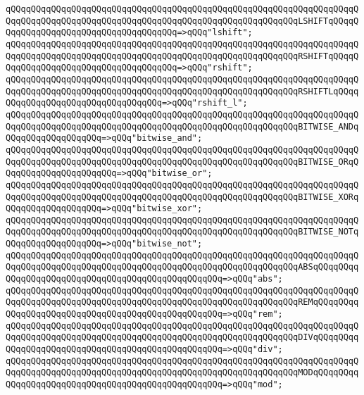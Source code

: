 \verb|qQQqqQQqqQQqqQQqqQQqqQQqqQQqqQQqqQQqqQQqqQQqqQQqqQQqqQQqqQQqqQQqqQQqqQQqqQQqqQQqqQQqqQQqqQQqqQQqqQQqqQQqqQQqqQQqqQQqqQQqqQQqqQQqLSHIFTqQQqqQQqqQQqqQQqqQQqqQQqqQQqqQQqqQQqqQQq=>qQQq"lshift";|\newline
\verb|qQQqqQQqqQQqqQQqqQQqqQQqqQQqqQQqqQQqqQQqqQQqqQQqqQQqqQQqqQQqqQQqqQQqqQQqqQQqqQQqqQQqqQQqqQQqqQQqqQQqqQQqqQQqqQQqqQQqqQQqqQQqqQQqRSHIFTqQQqqQQqqQQqqQQqqQQqqQQqqQQqqQQqqQQqqQQq=>qQQq"rshift";|\newline
\verb|qQQqqQQqqQQqqQQqqQQqqQQqqQQqqQQqqQQqqQQqqQQqqQQqqQQqqQQqqQQqqQQqqQQqqQQqqQQqqQQqqQQqqQQqqQQqqQQqqQQqqQQqqQQqqQQqqQQqqQQqqQQqqQQqRSHIFTLqQQqqQQqqQQqqQQqqQQqqQQqqQQqqQQqqQQq=>qQQq"rshift_l";|\newline
\verb|qQQqqQQqqQQqqQQqqQQqqQQqqQQqqQQqqQQqqQQqqQQqqQQqqQQqqQQqqQQqqQQqqQQqqQQqqQQqqQQqqQQqqQQqqQQqqQQqqQQqqQQqqQQqqQQqqQQqqQQqqQQqqQQqBITWISE_ANDqQQqqQQqqQQqqQQqqQQq=>qQQq"bitwise_and";|\newline
\verb|qQQqqQQqqQQqqQQqqQQqqQQqqQQqqQQqqQQqqQQqqQQqqQQqqQQqqQQqqQQqqQQqqQQqqQQqqQQqqQQqqQQqqQQqqQQqqQQqqQQqqQQqqQQqqQQqqQQqqQQqqQQqqQQqBITWISE_ORqQQqqQQqqQQqqQQqqQQqqQQq=>qQQq"bitwise_or";|\newline
\verb|qQQqqQQqqQQqqQQqqQQqqQQqqQQqqQQqqQQqqQQqqQQqqQQqqQQqqQQqqQQqqQQqqQQqqQQqqQQqqQQqqQQqqQQqqQQqqQQqqQQqqQQqqQQqqQQqqQQqqQQqqQQqqQQqBITWISE_XORqQQqqQQqqQQqqQQqqQQq=>qQQq"bitwise_xor";|\newline
\verb|qQQqqQQqqQQqqQQqqQQqqQQqqQQqqQQqqQQqqQQqqQQqqQQqqQQqqQQqqQQqqQQqqQQqqQQqqQQqqQQqqQQqqQQqqQQqqQQqqQQqqQQqqQQqqQQqqQQqqQQqqQQqqQQqBITWISE_NOTqQQqqQQqqQQqqQQqqQQq=>qQQq"bitwise_not";|\newline
\verb|qQQqqQQqqQQqqQQqqQQqqQQqqQQqqQQqqQQqqQQqqQQqqQQqqQQqqQQqqQQqqQQqqQQqqQQqqQQqqQQqqQQqqQQqqQQqqQQqqQQqqQQqqQQqqQQqqQQqqQQqqQQqqQQqABSqQQqqQQqqQQqqQQqqQQqqQQqqQQqqQQqqQQqqQQqqQQqqQQqqQQq=>qQQq"abs";|\newline
\verb|qQQqqQQqqQQqqQQqqQQqqQQqqQQqqQQqqQQqqQQqqQQqqQQqqQQqqQQqqQQqqQQqqQQqqQQqqQQqqQQqqQQqqQQqqQQqqQQqqQQqqQQqqQQqqQQqqQQqqQQqqQQqqQQqREMqQQqqQQqqQQqqQQqqQQqqQQqqQQqqQQqqQQqqQQqqQQqqQQqqQQq=>qQQq"rem";|\newline
\verb|qQQqqQQqqQQqqQQqqQQqqQQqqQQqqQQqqQQqqQQqqQQqqQQqqQQqqQQqqQQqqQQqqQQqqQQqqQQqqQQqqQQqqQQqqQQqqQQqqQQqqQQqqQQqqQQqqQQqqQQqqQQqqQQqDIVqQQqqQQqqQQqqQQqqQQqqQQqqQQqqQQqqQQqqQQqqQQqqQQqqQQq=>qQQq"div";|\newline
\verb|qQQqqQQqqQQqqQQqqQQqqQQqqQQqqQQqqQQqqQQqqQQqqQQqqQQqqQQqqQQqqQQqqQQqqQQqqQQqqQQqqQQqqQQqqQQqqQQqqQQqqQQqqQQqqQQqqQQqqQQqqQQqqQQqMODqQQqqQQqqQQqqQQqqQQqqQQqqQQqqQQqqQQqqQQqqQQqqQQqqQQq=>qQQq"mod";|\newline
